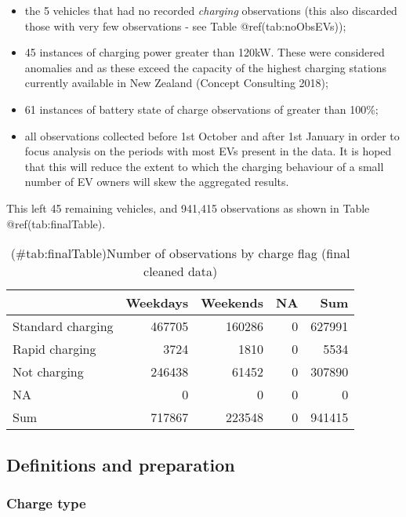 \documentclass[]{article}
\providecommand{\tightlist}{%
  \setlength{\itemsep}{0pt}\setlength{\parskip}{0pt}}
\begin{document}
\begin{itemize}
\tightlist
\item
  the 5 vehicles that had no recorded \emph{charging} observations (this also discarded those with very few observations - see Table @ref(tab:noObsEVs));
\item
  45 instances of charging power greater than 120kW. These were considered anomalies and as these exceed the capacity of the highest charging stations currently available in New Zealand (Concept Consulting 2018);
\item
  61 instances of battery state of charge observations of greater than 100\%;
\item
  all observations collected before 1st October and after 1st January in order to focus analysis on the periods with most EVs present in the data. It is hoped that this will reduce the extent to which the charging behaviour of a small number of EV owners will skew the aggregated results.
\end{itemize}

This left 45 remaining vehicles, and 941,415 observations as shown in Table @ref(tab:finalTable).

\begin{table}[t]

\caption{(\#tab:finalTable)Number of observations by charge flag (final cleaned data)}
\centering
\begin{tabular}{l|r|r|r|r}
\hline
  & Weekdays & Weekends & NA & Sum\\
\hline
Standard charging & 467705 & 160286 & 0 & 627991\\
\hline
Rapid charging & 3724 & 1810 & 0 & 5534\\
\hline
Not charging & 246438 & 61452 & 0 & 307890\\
\hline
NA & 0 & 0 & 0 & 0\\
\hline
Sum & 717867 & 223548 & 0 & 941415\\
\hline
\end{tabular}
\end{table}

\hypertarget{definitions}{%
\subsection{Definitions and preparation}\label{definitions}}

\hypertarget{chargeType}{%
\subsubsection{Charge type}\label{chargeType}}
\end{document}
